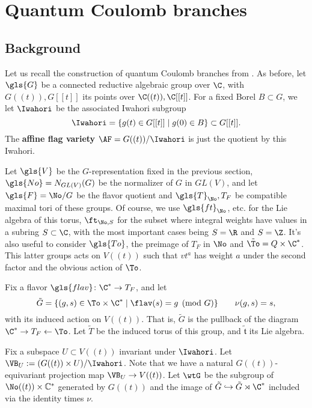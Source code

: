 \section{Quantum Coulomb branches}

\subsection{Background}
\label{sec:background}



Let us recall the construction of quantum Coulomb branches from
\cite{WebSD}.  As before, let $\gls{G}$ be a connected reductive algebraic
group over $\C$, with $G((t)), G[[t]]$ its points over
$\C((t)), \C[[t]]$. For a fixed Borel $B\subset G$, we let $\Iwahori$
be the associated Iwahori subgroup
\[\Iwahori=\{g(t)\in G[[t]]\mid g(0)\in B\}\subset G[[t]].\]  The {\bf affine flag variety} $\AF=G((t))/\Iwahori$ is
just the quotient by this Iwahori.  


Let $\gls{V}$ be the $G$-representation fixed in the previous section, 
$\gls{No}=N_{GL(V)}(G)$ be the normalizer of $G$ in $GL(V)$, and let
$\gls{F}=\No/G$ be the flavor quotient and $\gls{T}_\No,T_{F}$ be compatible maximal tori of
these groups.  
Of course, we use $\gls{ft}_{\No}$, etc. for the Lie algebra of this
torus, $\ft_{\No,S}$ for the subset where integral weights have
values in a subring $S\subset \C$, with the most important cases being
$S=\R$ and $S=\Z$.    It's also useful to consider $\gls{To}$, the preimage of
$T_F$ in $\No$ and $\tilde{\To}=Q\times \C^*$.  This latter groups acts on $V((t))$
such that $vt^a$ has weight $a$ under the second factor and the
obvious action of $\To$.

Fix a flavor $\gls{flav}\colon \C^*\to T_F$, and let 
\[\tilde{G} =\{(g,s)\in \To\times \C^* \mid \flav(s)=g\pmod G\}\qquad
  \nu(g,s)=s,\]
with its induced action on $V((t))$.  
That is, $\tilde{G}$ is the pullback of the diagram $\C^*\to T_F \leftarrow
\To$. Let $\tilde{T}$ be the induced torus of this group, and
$\tilde{\mathfrak{t}}$ its Lie algebra. 

Fix a subspace $U\subset V((t))$ invariant under $\Iwahori$.  
Let $\VB_U:=(G((t)) \times U)/\Iwahori$.  Note that we have a
natural $G((t))$-equivariant projection map $\VB_U\to V((t))$. 
Let
$\wtG$ be the subgroup of $\No((t))\times
\mathbb{C}^*$ generated by $G((t))$ and the image of
$\tilde{G}\hookrightarrow \tilde{G}\rtimes \C^*$ included via the
identity times $\nu$.  

